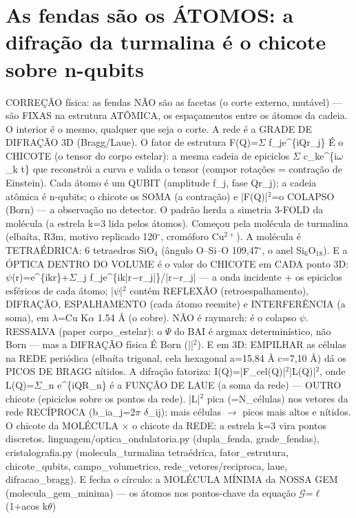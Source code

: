 \documentclass[11pt,a4paper]{article}
\begin{document}
\section{As fendas são os ÁTOMOS: a difração da turmalina é o chicote sobre n-qubits}
CORREÇÃO física: as fendas NÃO são as facetas (o corte externo, mutável) — são FIXAS na estrutura ATÔMICA, os espaçamentos entre os átomos da cadeia. O interior é o mesmo, qualquer que seja o corte. A rede é a GRADE DE DIFRAÇÃO 3D (Bragg/Laue). O fator de estrutura F(Q)=\ensuremath{\Sigma} f\_j\textperiodcentered e\^{}\{iQ\textperiodcentered r\_j\} É o CHICOTE (o tensor do corpo estelar): a mesma cadeia de epiciclos \ensuremath{\Sigma} c\_k\textperiodcentered e\^{}\{i\ensuremath{\omega}\_k t\} que reconstrói a curva e valida o tensor (compor rotações = contração de Einstein). Cada átomo é um QUBIT (amplitude f\_j, fase Q\textperiodcentered r\_j); a cadeia atômica é n-qubits; o chicote os SOMA (a contração) e |F(Q)|\ensuremath{^{2}}=o COLAPSO (Born) — a observação no detector. O padrão herda a simetria 3-FOLD da molécula (a estrela k=3 lida pelos átomos). Começou pela molécula de turmalina (elbaíta, R3m, motivo replicado 120$^{\circ}$, cromóforo Cu\ensuremath{^{2+}}). A molécula é TETRAÉDRICA: 6 tetraedros SiO\ensuremath{_{4}} (ângulo O–Si–O 109,47$^{\circ}$, o anel Si\ensuremath{_{6}}O\ensuremath{_{18}}). E a ÓPTICA DENTRO DO VOLUME é o valor do CHICOTE em CADA ponto 3D: \ensuremath{\psi}(r)=e\^{}\{ik\textperiodcentered r\}+\ensuremath{\Sigma}\_j f\_j\textperiodcentered e\^{}\{ik|r\ensuremath{-}r\_j|\}/|r\ensuremath{-}r\_j| — a onda incidente + os epiciclos esféricos de cada átomo; |\ensuremath{\psi}|\ensuremath{^{2}} contém REFLEXÃO (retroespalhamento), DIFRAÇÃO, ESPALHAMENTO (cada átomo reemite) e INTERFERÊNCIA (a soma), em \ensuremath{\lambda}=Cu K\ensuremath{\alpha} 1.54 \ensuremath{\text{\AA}} (o cobre). NÃO é raymarch: é o colapso \ensuremath{\psi}. RESSALVA (paper corpo\_estelar): o \ensuremath{\Psi} do BAI é argmax determinístico, não Born — mas a DIFRAÇÃO física É Born (|\textperiodcentered |\ensuremath{^{2}}). E em 3D: EMPILHAR as células na REDE periódica (elbaíta trigonal, cela hexagonal a=15,84 \ensuremath{\text{\AA}} c=7,10 \ensuremath{\text{\AA}}) dá os PICOS DE BRAGG nítidos. A difração fatoriza: I(Q)=|F\_cel(Q)|\ensuremath{^{2}}\textperiodcentered |L(Q)|\ensuremath{^{2}}, onde L(Q)=\ensuremath{\Sigma}\_n e\^{}\{iQ\textperiodcentered R\_n\} é a FUNÇÃO DE LAUE (a soma da rede) — OUTRO chicote (epiciclos sobre os pontos da rede). |L|\ensuremath{^{2}} pica (=N\_células) nos vetores da rede RECÍPROCA (b\_i\textperiodcentered a\_j=2\ensuremath{\pi} \ensuremath{\delta}\_ij); mais células \ensuremath{\to} picos mais altos e nítidos. O chicote da MOLÉCULA $\times$ o chicote da REDE: a estrela k=3 vira pontos discretos. linguagem/optica\_ondulatoria.py (dupla\_fenda, grade\_fendas), cristalografia.py (molecula\_turmalina tetraédrica, fator\_estrutura, chicote\_qubits, campo\_volumetrico, rede\_vetores/reciproca, laue, difracao\_bragg). E fecha o círculo: a MOLÉCULA MÍNIMA da NOSSA GEM (molecula\_gem\_minima) — os átomos nos pontos-chave da equação \ensuremath{\mathcal{G}}=\ensuremath{\ell}\textperiodcentered (1+a\textperiodcentered cos k\ensuremath{\theta})\textperiodcentered 
\end{document}
